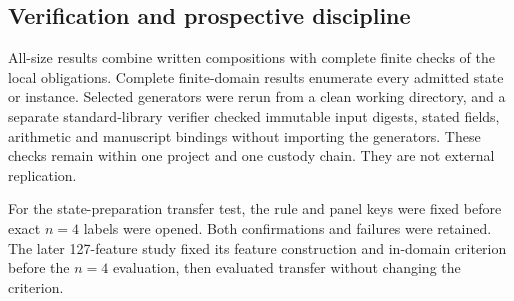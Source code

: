 \subsection{Verification and prospective discipline}

All-size results combine written compositions with complete finite checks of the local obligations.  Complete finite-domain results enumerate every admitted state or instance.  Selected generators were rerun from a clean working directory, and a separate standard-library verifier checked immutable input digests, stated fields, arithmetic and manuscript bindings without importing the generators.  These checks remain within one project and one custody chain.  They are not external replication.

For the state-preparation transfer test, the rule and panel keys were fixed before exact $n=4$ labels were opened.  Both confirmations and failures were retained.  The later 127-feature study fixed its feature construction and in-domain criterion before the $n=4$ evaluation, then evaluated transfer without changing the criterion.
